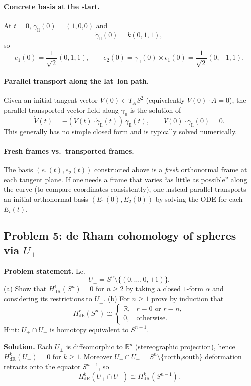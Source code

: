 \documentclass[12pt,a4paper]{article}
\theoremstyle{plain}
\theoremstyle{definition}      %
\begin{document}
\paragraph{Concrete basis at the start.}
At $t=0$, $\gamma_{\mathrm{ll}}(0)=(1,0,0)$ and
\[
\dot\gamma_{\mathrm{ll}}(0)=k(0,1,1),
\]
so
\[
e_1(0)=\frac{1}{\sqrt2}(0,1,1),
\qquad
e_2(0)=\gamma_{\mathrm{ll}}(0)\times e_1(0)=\frac{1}{\sqrt2}(0,-1,1).
\]

\paragraph{Parallel transport along the lat--lon path.}
Given an initial tangent vector $V(0)\in T_{A}S^2$ (equivalently $V(0)\cdot A=0$),
the parallel-transported vector field along $\gamma_{\mathrm{ll}}$ is the solution of
\[
\boxed{\ \dot V(t)=-(V(t)\cdot \dot\gamma_{\mathrm{ll}}(t))\,\gamma_{\mathrm{ll}}(t),\qquad
	V(0)\cdot \gamma_{\mathrm{ll}}(0)=0.\ }
\]
This generally has no simple closed form and is typically solved numerically.

\paragraph{Fresh frames vs.\ transported frames.}
The basis $(e_1(t),e_2(t))$ constructed above is a \emph{fresh} orthonormal frame at each tangent plane.
If one needs a frame that varies ``as little as possible'' along the curve (to compare coordinates consistently),
one instead parallel-transports an initial orthonormal basis $(E_1(0),E_2(0))$ by solving the ODE for each $E_i(t)$.

	
	\subsection*{Problem 5: de Rham cohomology of spheres via $U_\pm$}
	
	\noindent \textbf{Problem statement.}
	Let
	\[
	U_\pm = S^n\setminus\{(0,\dots,0,\pm 1)\}.
	\]
	(a) Show that $H^1_{\mathrm{dR}}(S^n)=0$ for $n\ge 2$ by taking a closed $1$-form $\alpha$ and considering
	its restrictions to $U_\pm$.
	(b) For $n\ge 1$ prove by induction that
	\[
	H^r_{\mathrm{dR}}(S^n)\cong
	\begin{cases}
		\mathbb{R}, & r=0 \text{ or } r=n,\\
		0, & \text{otherwise}.
	\end{cases}
	\]
	Hint: $U_+\cap U_-$ is homotopy equivalent to $S^{n-1}$.
	
	\medskip
	\noindent \textbf{Solution.}
	Each $U_\pm$ is diffeomorphic to $\mathbb{R}^n$ (stereographic projection), hence
	$H^k_{\mathrm{dR}}(U_\pm)=0$ for $k\ge 1$.
	Moreover $U_+\cap U_-=S^n\setminus\{\text{north,south}\}$ deformation retracts onto the equator $S^{n-1}$, so
	\[
	H^k_{\mathrm{dR}}(U_+\cap U_-)\cong H^k_{\mathrm{dR}}(S^{n-1}).
	\]
	
\end{document}
